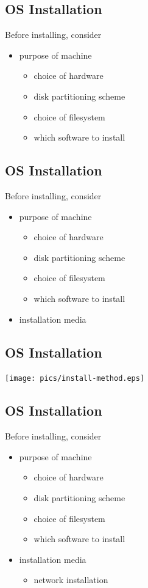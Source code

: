 \documentclass[xga]{xdvislides}
\begin{document}
\subsection{OS Installation}
Before installing, consider
\begin{itemize}
	\item purpose of machine
		\begin{itemize}
			\item choice of hardware
			\item disk partitioning scheme
			\item choice of filesystem
			\item which software to install
		\end{itemize}
\end{itemize}

\subsection{OS Installation}
Before installing, consider
\begin{itemize}
	\item purpose of machine
		\begin{itemize}
			\item choice of hardware
			\item disk partitioning scheme
			\item choice of filesystem
			\item which software to install
		\end{itemize}
	\item installation media
\end{itemize}

\subsection{OS Installation}
\begin{center}
	\texttt{[image: pics/install-method.eps]}
\end{center}

\subsection{OS Installation}
Before installing, consider
\begin{itemize}
	\item purpose of machine
		\begin{itemize}
			\item choice of hardware
			\item disk partitioning scheme
			\item choice of filesystem
			\item which software to install
		\end{itemize}
	\item installation media
		\begin{itemize}
			\item network installation
		\end{itemize}
\end{itemize}
\end{document}
